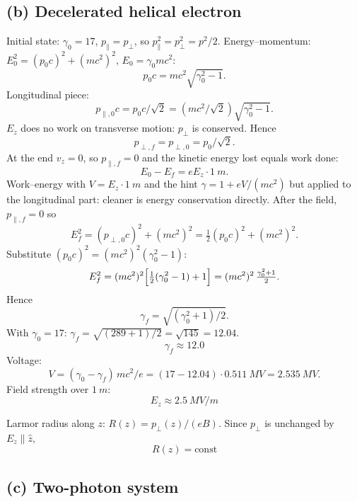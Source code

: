 \documentclass[11pt]{article}
\begin{document}
\subsection*{(b) Decelerated helical electron}

Initial state: $\gamma_0 = 17$, $p_\| = p_\perp$, so $p_\|^2 = p_\perp^2 = p^2/2$.
Energy--momentum: $E_0^2 = (p_0 c)^2 + (m c^2)^2$, $E_0 = \gamma_0 m c^2$:
\[ p_0 c = m c^2\sqrt{\gamma_0^2-1}. \]
Longitudinal piece:
\[ p_{\|,0} c = p_0 c/\sqrt 2 = (m c^2/\sqrt 2)\sqrt{\gamma_0^2-1}. \]
$E_z$ does no work on transverse motion: $p_\perp$ is conserved. Hence
\[ p_{\perp,f} = p_{\perp,0} = p_0/\sqrt 2. \]
At the end $v_z = 0$, so $p_{\|,f}=0$ and the kinetic energy lost equals work done:
\[ E_0 - E_f = e E_z \cdot \SI{1}{m}. \]
Work--energy with $V = E_z\cdot\SI{1}{m}$ and the hint $\gamma = 1 + eV/(m c^2)$ but applied to the longitudinal part: cleaner is energy conservation directly. After the field, $p_{\|,f}=0$ so
\[ E_f^2 = (p_{\perp,0} c)^2 + (m c^2)^2 = \tfrac{1}{2}(p_0 c)^2 + (m c^2)^2. \]
Substitute $(p_0 c)^2 = (m c^2)^2(\gamma_0^2 - 1)$:
\[ E_f^2 = (m c^2)^2\Bigl[\tfrac{1}{2}(\gamma_0^2-1) + 1\Bigr] = (m c^2)^2\,\tfrac{\gamma_0^2+1}{2}. \]
Hence
\[ \gamma_f = \sqrt{(\gamma_0^2+1)/2}. \]
With $\gamma_0=17$: $\gamma_f = \sqrt{(289+1)/2} = \sqrt{145} = 12.04$.
\[ \boxed{\;\gamma_f \approx 12.0\;} \]
Voltage:
\[ V = (\gamma_0-\gamma_f)\,m c^2/e = (17-12.04)\cdot\SI{0.511}{MV} = \SI{2.535}{MV}. \]
Field strength over $\SI{1}{m}$:
\[ \boxed{\;E_z \approx \SI{2.5}{MV/m}\;} \]

Larmor radius along $z$: $R(z) = p_\perp(z)/(eB)$. Since $p_\perp$ is unchanged by $E_z\parallel\hat z$,
\[ \boxed{\;R(z) = \text{const}\;} \]

\begin{center}
\end{center}

\subsection*{(c) Two-photon system}
\end{document}
